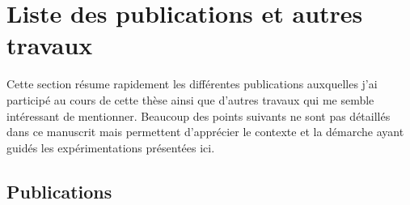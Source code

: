 
\section{Liste des publications et autres travaux\label{sec:publications_and_works}}

Cette section résume rapidement les différentes publications
auxquelles j'ai participé au cours de cette thèse 
ainsi que d'autres travaux qui me semble intéressant de mentionner.
Beaucoup des points suivants ne sont pas détaillés dans ce manuscrit
mais permettent d'apprécier le contexte et la démarche ayant guidés 
les expérimentations présentées ici.

\subsection{Publications}


